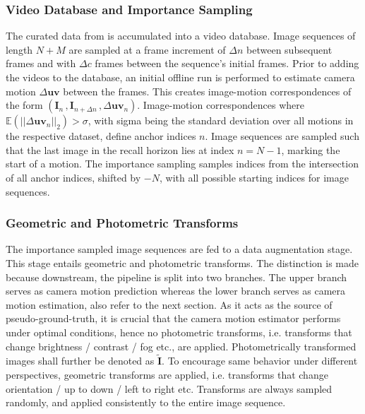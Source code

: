 \subsubsection{Video Database and Importance Sampling}
\label{c4:sec:video_database_and_importance_sampling}
The curated data from  is accumulated into a video database. Image sequences of length $N+M$ are sampled at a frame increment of $\Delta n$ between subsequent frames and with $\Delta c$ frames between the sequence's initial frames. Prior to adding the videos to the database, an initial offline run is performed to estimate camera motion $\Delta\mathbf{uv}$ between the frames. This creates image-motion correspondences of the form $(\mathbf{I}_n\,,\mathbf{I}_{n+\Delta n}\,,\Delta\mathbf{uv}_n)$. Image-motion correspondences where $\mathbb{E}(||\Delta\mathbf{uv}_n||_2) > \sigma$, with sigma being the standard deviation over all motions in the respective dataset, define anchor indices $n$. Image sequences are sampled such that the last image in the recall horizon lies at index $n = N-1$, marking the start of a motion. The importance sampling samples indices from the intersection of all anchor indices, shifted by $-N$, with all possible starting indices for image sequences.

\subsubsection{Geometric and Photometric Transforms}
\label{c4:sec:geometric_and_photometric_transforms}
The importance sampled image sequences are fed to a data augmentation stage. This stage entails geometric and photometric transforms. The distinction is made because downstream, the pipeline is split into two branches. The upper branch serves as camera motion prediction whereas the lower branch serves as camera motion estimation, also refer to the next section.
As it acts as the source of pseudo-ground-truth,
it is crucial that the camera motion estimator performs under optimal conditions, hence no photometric transforms, i.e. transforms that change brightness / contrast / fog etc., are applied. Photometrically transformed images shall further be denoted as $\tilde{\mathbf{I}}$. To encourage same behavior under different perspectives, geometric transforms are applied, i.e. transforms that change orientation / up to down / left to right etc. Transforms are always
sampled randomly, and 
applied consistently to the entire image sequence.
 
